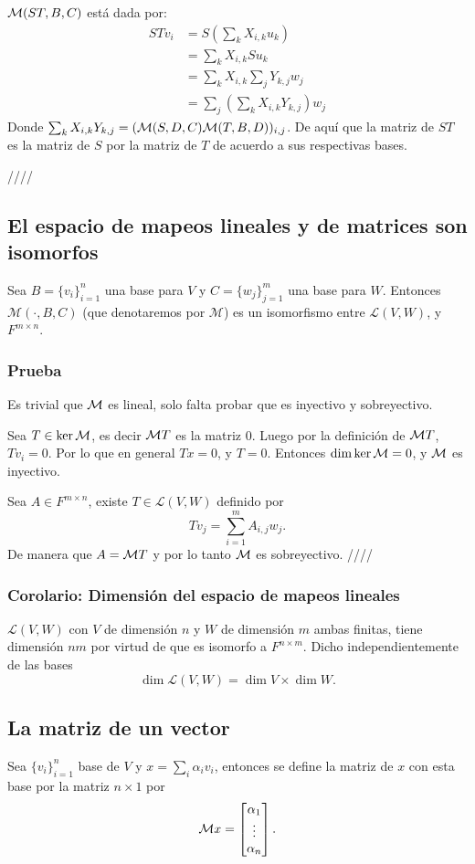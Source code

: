 \documentclass{article}
\begin{document}
$\mathcal{M}(ST,B,C)$ está dada por: 
\begin{align*}
    STv_i &= S\left(\sum_k X_{i,k}u_k\right)\\
    &= \sum_k X_{i,k} Su_k\\
    &= \sum_k X_{i,k} \sum_j Y_{k,j} w_j \\
    &= \sum_j \left(\sum_k X_{i,k} Y_{k,j}\right) w_j
\end{align*}
Donde $\sum_k X_{i,k} Y_{k,j} = (\mathcal{M}(S,D,C)\mathcal{M}(T,B,D))_{i,j}$.
De aquí que la matriz de $ST$ es la matriz de $S$ por la matriz
de $T$ de acuerdo a sus respectivas bases.

\hfill ////

\subsection{El espacio de mapeos lineales y de matrices son isomorfos}
Sea $B=\{v_i\}_{i=1}^n$ una base para $V$ y $C=\{w_j\}_{j=1}^m$ una base
para $W$. Entonces $\mathcal{M}(\cdot, B, C)$ (que denotaremos por 
$\mathcal{M}$) es un isomorfismo
entre $\mathcal{L}(V,W)$, y $F^{m\times n}$.
\subsubsection*{Prueba}
Es trivial que $\mathcal{M}$ es lineal, solo falta probar que es inyectivo y 
sobreyectivo.

Sea $T\in\ker\mathcal{M}$, es decir $\mathcal{M} T$ es la matriz $0$. Luego por la
definición de $\mathcal{M} T$, $Tv_i = 0$. Por lo que en general $Tx=0$,
y $T=0$. Entonces $\dim\ker\mathcal{M} = 0$, y $\mathcal{M}$ es inyectivo.

Sea $A\in F^{m\times n}$, existe $T\in\mathcal{L}(V,W)$ definido
por $$Tv_j = \sum^m_{i=1}A_{i,j} w_j.$$
De manera que $A=\mathcal{M} T$ y por lo tanto $\mathcal{M}$ es sobreyectivo.
\hfill ////

\subsubsection{Corolario: Dimensión del espacio de mapeos lineales}
$\mathcal{L}(V,W)$ con $V$ de dimensión $n$ y $W$ de dimensión $m$
ambas finitas, tiene dimensión $nm$ por virtud de que es isomorfo a
$F^{n\times m}$. Dicho independientemente de las bases
$$\dim \mathcal{L}(V,W) = \dim V \times \dim W.$$

\subsection{La matriz de un vector}
Sea $\{v_i\}_{i=1}^n$ base de $V$ y $x=\sum_i\alpha_i v_i$, 
entonces se define la matriz de $x$ con esta base por la matriz
$n\times 1$ por
$$\mathcal{M} x = \begin{bmatrix}
    \alpha_1 \\
    \vdots \\
    \alpha_n
\end{bmatrix}.$$
\end{document}
